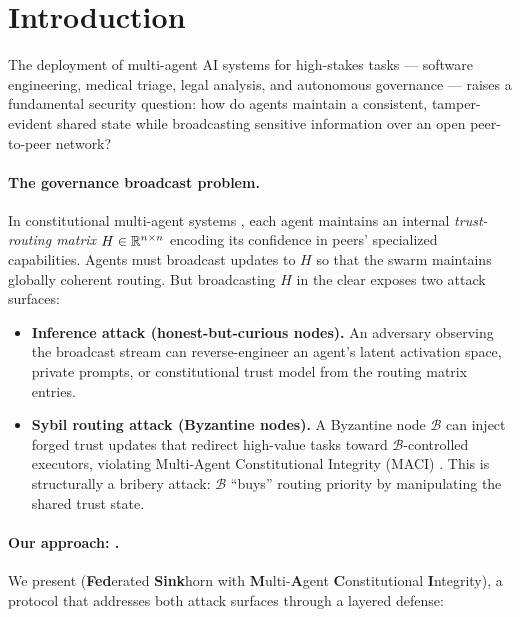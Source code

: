 \section{Introduction}
\label{sec:introduction}

The deployment of multi-agent AI systems for high-stakes tasks —
software engineering, medical triage, legal analysis, and autonomous governance — raises
a fundamental security question: how do agents maintain a consistent, tamper-evident
shared state while broadcasting sensitive information over an open peer-to-peer network?

\paragraph{The governance broadcast problem.}
In constitutional multi-agent systems \cite{bai2022constitutional,acgs2025}, each agent
maintains an internal \emph{trust-routing matrix} $H \in \mathbb{R}^{n \times n}$ encoding its
confidence in peers' specialized capabilities.  Agents must broadcast updates to $H$
so that the swarm maintains globally coherent routing.  But broadcasting $H$ in the
clear exposes two attack surfaces:

\begin{itemize}
  \item \textbf{Inference attack (honest-but-curious nodes).}  An adversary observing
    the broadcast stream can reverse-engineer an agent's latent activation space,
    private prompts, or constitutional trust model from the routing matrix entries.

  \item \textbf{Sybil routing attack (Byzantine nodes).}  A Byzantine node $\mathcal{B}$
    can inject forged trust updates that redirect high-value tasks toward
    $\mathcal{B}$-controlled executors, violating Multi-Agent Constitutional Integrity
    (MACI) \cite{maci_spec}.  This is structurally a bribery attack: $\mathcal{B}$
    ``buys'' routing priority by manipulating the shared trust state.
\end{itemize}

\paragraph{Our approach: \fedsink{}.}
We present \fedsink{} (\textbf{Fed}erated \textbf{Sink}horn with \textbf{M}ulti-\textbf{A}gent
\textbf{C}onstitutional \textbf{I}ntegrity), a protocol that addresses both attack surfaces
through a layered defense:

